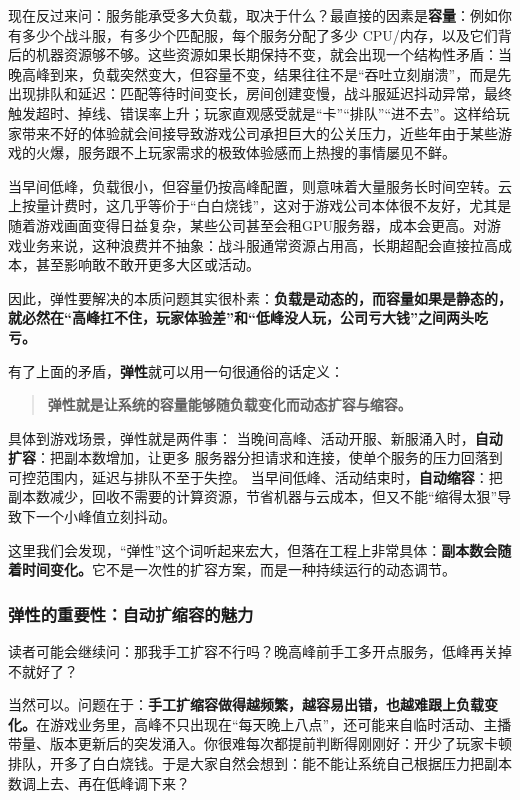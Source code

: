 现在反过来问：服务能承受多大负载，取决于什么？最直接的因素是\textbf{容量}：例如你有多少个战斗服，有多少个匹配服，每个服务分配了多少 CPU/内存，以及它们背后的机器资源够不够。这些资源如果长期保持不变，就会出现一个结构性矛盾：当晚高峰到来，负载突然变大，但容量不变，结果往往不是“吞吐立刻崩溃”，而是先出现排队和延迟：匹配等待时间变长，房间创建变慢，战斗服延迟抖动异常，最终触发超时、掉线、错误率上升；玩家直观感受就是“卡”“排队”“进不去”。这样给玩家带来不好的体验就会间接导致游戏公司承担巨大的公关压力，近些年由于某些游戏的火爆，服务跟不上玩家需求的极致体验感而上热搜的事情屡见不鲜。

当早间低峰，负载很小，但容量仍按高峰配置，则意味着大量服务长时间空转。云上按量计费时，这几乎等价于“白白烧钱”，这对于游戏公司本体很不友好，尤其是随着游戏画面变得日益复杂，某些公司甚至会租GPU服务器，成本会更高。对游戏业务来说，这种浪费并不抽象：战斗服通常资源占用高，长期超配会直接拉高成本，甚至影响敢不敢开更多大区或活动。

因此，弹性要解决的本质问题其实很朴素：\textbf{负载是动态的，而容量如果是静态的，就必然在“高峰扛不住，玩家体验差”和“低峰没人玩，公司亏大钱”之间两头吃亏。}

有了上面的矛盾，\textbf{弹性}就可以用一句很通俗的话定义：\begin{quote}
\textbf{弹性就是让系统的容量能够随负载变化而动态扩容与缩容。}
\end{quote}

具体到游戏场景，弹性就是两件事：
当晚间高峰、活动开服、新服涌入时，\textbf{自动扩容}：把副本数增加，让更多 服务器分担请求和连接，使单个服务的压力回落到可控范围内，延迟与排队不至于失控。
当早间低峰、活动结束时，\textbf{自动缩容}：把副本数减少，回收不需要的计算资源，节省机器与云成本，但又不能“缩得太狠”导致下一个小峰值立刻抖动。

这里我们会发现，“弹性”这个词听起来宏大，但落在工程上非常具体：\textbf{副本数会随着时间变化。}它不是一次性的扩容方案，而是一种持续运行的动态调节。

\subsubsection{弹性的重要性：自动扩缩容的魅力}

读者可能会继续问：那我手工扩容不行吗？晚高峰前手工多开点服务，低峰再关掉不就好了？

当然可以。问题在于：\textbf{手工扩缩容做得越频繁，越容易出错，也越难跟上负载变化。}在游戏业务里，高峰不只出现在“每天晚上八点”，还可能来自临时活动、主播带量、版本更新后的突发涌入。你很难每次都提前判断得刚刚好：开少了玩家卡顿排队，开多了白白烧钱。于是大家自然会想到：能不能让系统自己根据压力把副本数调上去、再在低峰调下来？

